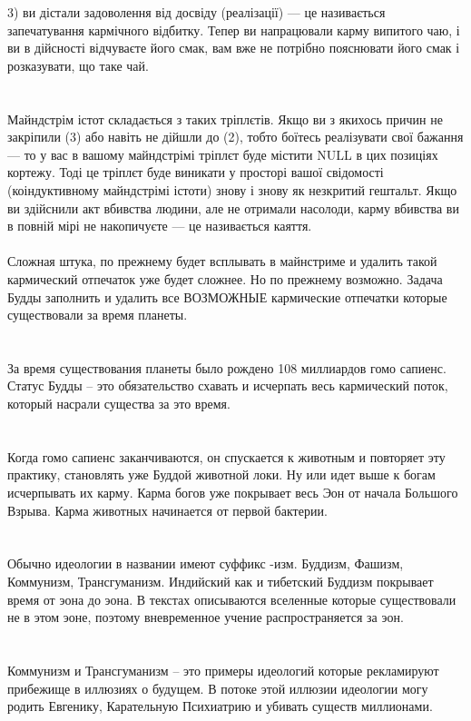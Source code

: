 3) ви дістали задоволення від досвіду (реалізації) --- це називається запечатування кармічного відбитку.
Тепер ви напрацювали карму випитого чаю, і ви в дійсності відчуваєте його смак, вам вже не потрібно
пояснювати його смак і розказувати, що таке чай.\\
\\
\\
Майндстрім істот складається з таких тріплєтів. Якщо ви з якихось причин не закріпили (3) або навіть не дійшли до (2),
тобто боїтесь реалізувати свої бажання --- то у вас в вашому майндстрімі тріплєт буде містити NULL в цих позиціях кортежу.
Тоді це тріплєт буде виникати у просторі вашої свідомості (коіндуктивному майндстрімі істоти) знову і знову як незкритий гештальт.
Якщо ви здійснили акт вбивства людини, але не отримали насолоди, карму вбивства ви в повній мірі не накопичуєте --- це називається каяття.
\\
\\
Сложная штука, по прежнему будет всплывать в майнстриме и удалить такой кармический
отпечаток уже будет сложнее. Но по прежнему возможно. Задача Будды заполнить и
удалить все ВОЗМОЖНЫЕ кармические отпечатки которые существовали за время планеты.\\
\\
\\
За время существования планеты было рождено 108 миллиардов гомо сапиенс. Статус Будды -- это обязательство схавать и исчерпать весь кармический поток, который насрали существа за это время.\\
\\
\\
Когда гомо сапиенс заканчиваются, он спускается к животным и повторяет эту практику, становлять уже Буддой животной локи. Ну или идет выше к богам исчерпывать их карму. Карма богов уже покрывает весь Эон от начала Большого Взрыва. Карма животных начинается от первой бактерии.\\
\\
\\
Обычно идеологии в названии имеют суффикс -изм. Буддизм, Фашизм, Коммунизм, Трансгуманизм. Индийский как и тибетский Буддизм покрывает время от эона до эона. В текстах описываются вселенные которые существовали не в этом эоне, поэтому вневременное учение распространяется за эон.\\
\\
\\
Коммунизм и Трансгуманизм -- это примеры идеологий которые рекламируют прибежище в иллюзиях о будущем. В потоке этой иллюзии идеологии могу родить Евгенику, Карательную Психиатрию и убивать существ миллионами.\\
